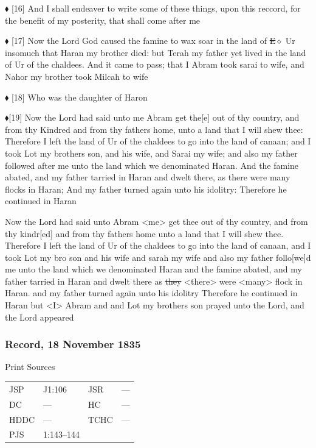 				$\blacklozenge$ [16]	And I shall endeaver to write some of these things, upon this reccord, for the benefit of my posterity, that shall come after me

				$\blacklozenge$ [17]	Now the Lord God caused the famine to wax soar in the land of \sout{E$\diamond$} Ur insomuch that Haran my brother died: but Terah my father yet lived in the land of Ur of the chaldees. And it came to pass; that I Abram took sarai to wife, and Nahor my brother took Milcah to wife

				$\blacklozenge$ [18]	Who was the daughter of Haron

				$\blacklozenge$[19]	Now the Lord had said unto me Abram get the[e] out of thy country, and from thy Kindred and from thy fathers home, unto a land that I will shew thee: Therefore I left the land of Ur of the chaldees to go into the land of canaan; and I took Lot my brothers son, and his wife, and Sarai my wife; and also my father followed after me unto the land which we denominated Haran. And the famine abated, and my father tarried in Haran and dwelt there, as there were many flocks in Haran; And my father turned again unto his idolitry: Therefore he continued in Haran

				Now the Lord had said unto Abram <me> get thee out of thy country, and from thy kindr[ed] and from thy fathers home unto a land that I will shew thee. Therefore I left the land of Ur of the chaldees to go into the land of canaan, and I took Lot my bro son and his wife and sarah my wife and also my father follo[we]d me unto the land which we denominated Haran and the famine abated, and my father tarried in Haran and dwelt there as \sout{they} <there> were <many> flock in Haran. and my father turned again unto his idolitry Therefore he continued in Haran but <I> Abram and and Lot my brothers son prayed unto the Lord, and the Lord appeared
				
		\subsubsection{Record, 18 November 1835}
			\label{EMS-1835-JS-18-NOV-1835}
			
			\begin{description}
				\item[Print Sources]
			\end{description}

				\begin{tabular}{p{0.5in}p{1in}p{0.5in}p{1in}}
				JSP	 	& J1:106		& JSR 		& --- \\
				DC	 	& --- 				& HC 		& --- \\
				HDDC 	& ---				& TCHC 		& --- \\
				PJS 	& 1:143--144			& 	 		&  \\
				\end{tabular}
			
